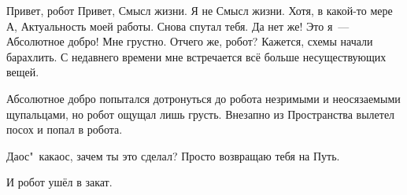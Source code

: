 \begin{dialog}
\X Привет, робот
\R Привет, Смысл жизни.
\X Я не Смысл жизни. Хотя, в какой-то мере\ldotst{}
\R А, Актуальность моей работы. Снова спутал тебя.
\X Да нет же! Это я~--- Абсолютное добро!
\R Мне грустно.
\X Отчего же, робот?
\R Кажется, схемы начали барахлить. С недавнего времени мне встречается всё больше несуществующих вещей.
\end{dialog}

\begin{monolog}
Абсолютное добро попытался дотронуться до робота незримыми и неосязаемыми щупальцами, но робот ощущал лишь грусть. Внезапно из Пространства вылетел посох и попал в робота.
\end{monolog}

\begin{dialog}
\R Даос"~какаос, зачем ты это сделал?
\X Просто возвращаю тебя на Путь.
\end{dialog}

\begin{monolog}
И робот ушёл в закат.
\end{monolog}
